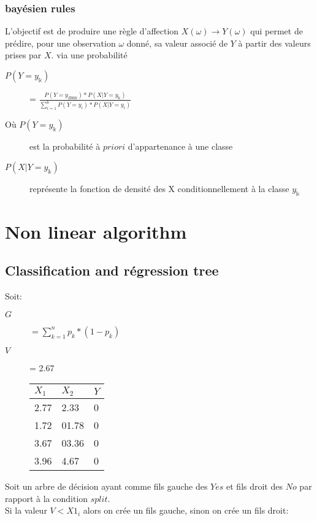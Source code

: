 \subsection{bayésien rules}
L'objectif est de produire une règle d'affection $X(\omega) \rightarrow Y(\omega)$ qui permet de prédire, pour une observation $\omega$ donné, sa valeur associé de $Y$ à partir des valeurs prises par $X$. via une probabilité\\
\begin{description}
\item[$P(Y=y_{\Bbbk})$] = $\frac{P(Y=y_{Bbbk})*P(X|Y=y_{\Bbbk})}{\sum_{i=1}^{\Bbbk} P(Y=y_i)*P(X|Y=y_i)}$
\item[Où $P(Y=y_{\Bbbk})$] est la probabilité à $priori$ d'appartenance à une classe
\item[$P(X|Y=y_{\Bbbk})$] représente la fonction de densité des X conditionnellement à la classe $y_{\Bbbk}$
\end{description}

\chapter{Non linear algorithm}
\section{Classification and régression tree}
Soit:\\
\begin{description}
\item[$G$] $ = \sum_{k=1}^n p_k * (1 - p_k)$
\item[$V$] = 2.67
\item[] \begin{tabular}{ll|l}
  \hline
  $ X_1 $ & $ X_2 $ &  $Y $\\
  \hline
  2.77 & 2.33 & 0\\
  1.72 & 01.78 & 0\\
  3.67 & 03.36 & 0\\
  3.96 & 4.67 & 0\\
  \hline
\end{tabular}
\end{description}

Soit un arbre de décision ayant comme fils gauche des $Yes$ et fils droit des $No$ par rapport à la condition $split$.\\
Si la valeur $V < X1_i$ alors on crée un fils gauche, sinon on crée un fils droit:\\


